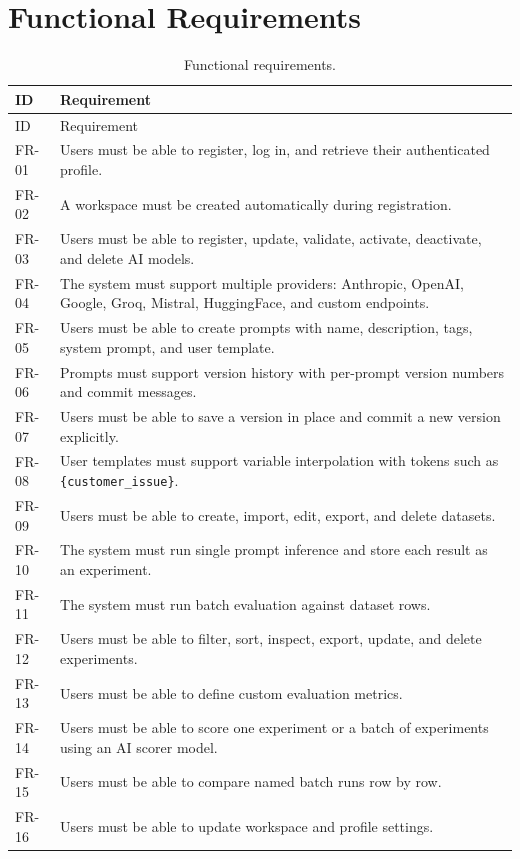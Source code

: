 \documentclass[12pt,a4paper]{report}
\begin{document}
\section{Functional Requirements}
\begin{longtable}{p{}p{}}
\caption{Functional requirements.}\\
\toprule
ID & Requirement \\
\midrule
\endfirsthead
\toprule
ID & Requirement \\
\midrule
\endhead
FR-01 & Users must be able to register, log in, and retrieve their authenticated profile. \\
FR-02 & A workspace must be created automatically during registration. \\
FR-03 & Users must be able to register, update, validate, activate, deactivate, and delete AI models. \\
FR-04 & The system must support multiple providers: Anthropic, OpenAI, Google, Groq, Mistral, HuggingFace, and custom endpoints. \\
FR-05 & Users must be able to create prompts with name, description, tags, system prompt, and user template. \\
FR-06 & Prompts must support version history with per-prompt version numbers and commit messages. \\
FR-07 & Users must be able to save a version in place and commit a new version explicitly. \\
FR-08 & User templates must support variable interpolation with tokens such as \texttt{\{customer\_issue\}}. \\
FR-09 & Users must be able to create, import, edit, export, and delete datasets. \\
FR-10 & The system must run single prompt inference and store each result as an experiment. \\
FR-11 & The system must run batch evaluation against dataset rows. \\
FR-12 & Users must be able to filter, sort, inspect, export, update, and delete experiments. \\
FR-13 & Users must be able to define custom evaluation metrics. \\
FR-14 & Users must be able to score one experiment or a batch of experiments using an AI scorer model. \\
FR-15 & Users must be able to compare named batch runs row by row. \\
FR-16 & Users must be able to update workspace and profile settings. \\
\bottomrule
\end{longtable}
\end{document}
